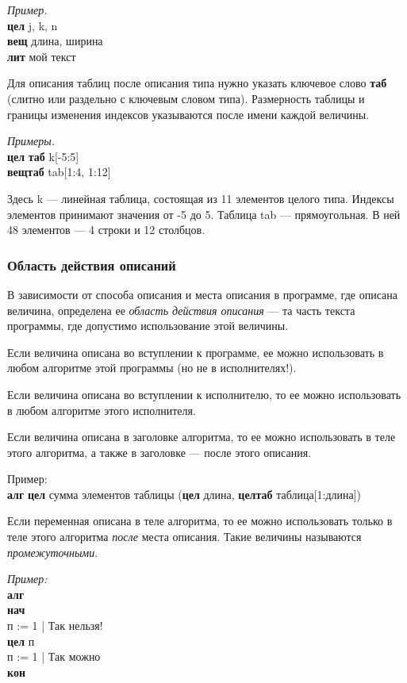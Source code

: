\emph{Пример.}\\
{\sffamily
	\textbf{цел} j, k, n\\
	\textbf{вещ} длина, ширина\\
	\textbf{лит} мой текст
}

Для описания таблиц после описания типа нужно указать ключевое слово \textbf{таб} (слитно или раздельно с ключевым словом типа). Размерность таблицы и границы изменения индексов указываются после имени каждой величины.

\emph{Примеры.}\\
{\sffamily
	\textbf{цел} \textbf{таб} k[-5:5]\\
        \textbf{вещтаб} tab[1:4, 1:12]
}

	Здесь \textsf{k} --- линейная таблица, состоящая из 11 элементов целого типа. Индексы элементов принимают значения от -5 до 5. Таблица \textsf{tab} --- прямоугольная. В ней 48 элементов --- 4 строки и 12 столбцов.

\subsubsection{Область действия описаний}

	В зависимости от  способа описания и места описания в программе, где описана величина, определена ее \emph{область действия описания} --- та часть текста программы, где допустимо использование этой величины. 

	Если величина описана во вступлении к программе, ее можно использовать в любом алгоритме этой программы (но не в исполнителях!).

	Если величина описана во вступлении к исполнителю, то ее можно использовать в любом алгоритме этого исполнителя. 

	Если величина описана в заголовке алгоритма, то ее можно использовать в теле этого алгоритма, а также в заголовке --- после этого описания.

	Пример:\\
\textsf{\textbf{алг} \textbf{цел} сумма элементов таблицы (\textbf{цел} длина, \textbf{целтаб} таблица[1:длина])}

	Если переменная описана в теле алгоритма, то ее можно использовать только в теле этого алгоритма \emph{после} места описания.  Такие величины называются \emph{промежуточными}.

\emph{Пример:}\\
{\sffamily
\textbf{алг}\\
\textbf{нач}\\
\otstup п := 1    |   Так нельзя!\\
\otstup \textbf{цел} п\\
\otstup п := 1    | Так можно\\
\textbf{кон}
}

